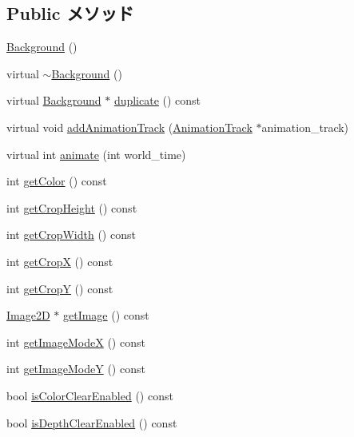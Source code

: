 \subsection*{Public メソッド}
\begin{CompactItemize}
\item 
\hyperlink{classm3g_1_1Background_2bbc220bb63956558a8603a7909c2bbd}{Background} ()
\item 
virtual \hyperlink{classm3g_1_1Background_b793cb50870532320856acdd2caf84c3}{$\sim$Background} ()
\item 
virtual \hyperlink{classm3g_1_1Background}{Background} $\ast$ \hyperlink{classm3g_1_1Background_f99eb943724fede230c51353bad6d453}{duplicate} () const 
\item 
virtual void \hyperlink{classm3g_1_1Background_415c0b110f95410ded9b85e5d99a496b}{addAnimationTrack} (\hyperlink{classm3g_1_1AnimationTrack}{AnimationTrack} $\ast$animation\_\-track)
\item 
virtual int \hyperlink{classm3g_1_1Background_8aad1ceab4c2a03609c8a42324ce484d}{animate} (int world\_\-time)
\item 
int \hyperlink{classm3g_1_1Background_4cfa1931c265ec3412fe3f6408a1b4f5}{getColor} () const 
\item 
int \hyperlink{classm3g_1_1Background_d6d9d6f23b7bb004c93642bcd081f4a3}{getCropHeight} () const 
\item 
int \hyperlink{classm3g_1_1Background_5c6515f6706675ef31ca5dfa0a03b953}{getCropWidth} () const 
\item 
int \hyperlink{classm3g_1_1Background_d0ba0211183decc8f0459ca598b12912}{getCropX} () const 
\item 
int \hyperlink{classm3g_1_1Background_9ef03b219415a1f08aef6745ad5d87d0}{getCropY} () const 
\item 
\hyperlink{classm3g_1_1Image2D}{Image2D} $\ast$ \hyperlink{classm3g_1_1Background_a8c0193b0e7d47d4b5c9f60df24c44f5}{getImage} () const 
\item 
int \hyperlink{classm3g_1_1Background_0dd60d498f4d50d8808c0b3ad61bc9e8}{getImageModeX} () const 
\item 
int \hyperlink{classm3g_1_1Background_a8d38d66f133ae417956a5dc5f84551d}{getImageModeY} () const 
\item 
bool \hyperlink{classm3g_1_1Background_d6b7bfdf4225b509549e2fbb9575b509}{isColorClearEnabled} () const 
\item 
bool \hyperlink{classm3g_1_1Background_d20a03183cd1c6418dcadf94ac0ca470}{isDepthClearEnabled} () const 
\item 

\end{CompactItemize}

